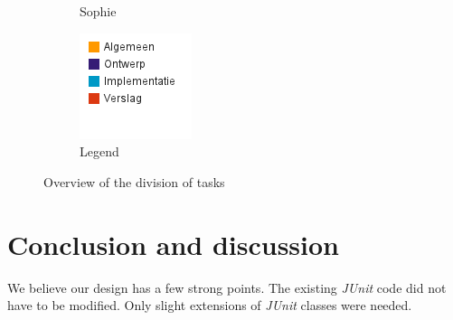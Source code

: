 \documentclass[i2]{oss}
\newcommand{\junit}{\emph{JUnit }}
\begin{document}
\begin{figure}[h!]
\begin{subfigure}[hb]{0.20\textwidth}
                \caption{Sophie}
        \end{subfigure}%
                \begin{subfigure}[hb]{0.20\textwidth}
                \centering
                \includegraphics[width=\textwidth]{legende}
                \caption{Legend}
        \end{subfigure}%


 \caption{Overview of the division of tasks}
\label{fig:werkverdeling}
\end{figure}





\section{Conclusion and discussion}
\label{ssec:conclusion}


We believe our design has a few strong points.
The existing \junit code did not have to be modified.
Only slight extensions of \junit classes were needed.
\end{document}
